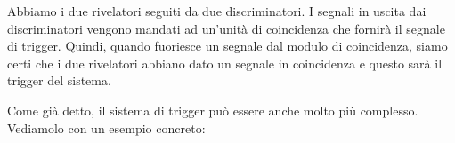 \begin{esempio}
\begin{figure}[H]
   \end{figure}
   Abbiamo i due rivelatori seguiti da due discriminatori. I segnali in uscita dai discriminatori vengono mandati ad un'unità di coincidenza che fornirà il segnale di trigger. Quindi, quando fuoriesce un segnale dal modulo di coincidenza, siamo certi che i due rivelatori abbiano dato un segnale in coincidenza e questo sarà il trigger del sistema.
\end{esempio}

Come già detto, il sistema di trigger può essere anche molto più complesso. Vediamolo con un esempio concreto:


